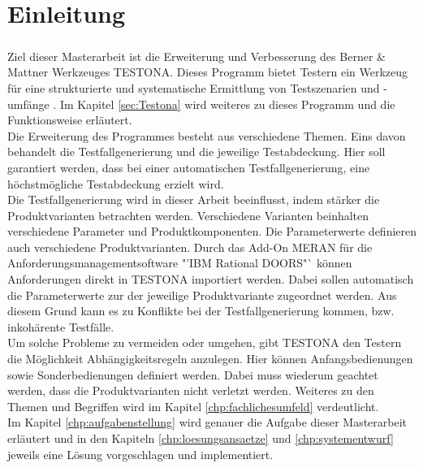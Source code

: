 \chapter{Einleitung}\label{chp:einleitung}
\paragraph{}
Ziel dieser Masterarbeit ist die Erweiterung und Verbesserung des Berner \& Mattner Werkzeuges TESTONA. Dieses Programm bietet Testern ein Werkzeug für eine strukturierte und systematische Ermittlung von Testszenarien und -umfänge \cite{TESTONA}. Im Kapitel \ref{sec:Testona} wird weiteres zu dieses Programm und die Funktionsweise erläutert.\\

Die Erweiterung des Programmes besteht aus verschiedene Themen. Eins davon behandelt die Testfallgenerierung und die jeweilige Testabdeckung. Hier soll garantiert werden, dass bei einer automatischen Testfallgenerierung, eine höchstmögliche Testabdeckung erzielt wird.\\

Die Testfallgenerierung wird in dieser Arbeit beeinflusst, indem stärker die Produktvarianten betrachten werden. Verschiedene Varianten beinhalten verschiedene Parameter und Produktkomponenten. Die Parameterwerte definieren auch verschiedene Produktvarianten. Durch das Add-On MERAN für die Anforderungsmanagementsoftware "'IBM Rational DOORS"` können Anforderungen direkt in  TESTONA importiert werden. Dabei sollen automatisch die Parameterwerte zur der jeweilige Produktvariante zugeordnet werden. Aus diesem Grund kann es zu Konflikte bei der Testfallgenerierung kommen, bzw. inkohärente Testfälle.\\

Um solche Probleme zu vermeiden oder umgehen, gibt TESTONA den Testern die Möglichkeit Abhängigkeitsregeln anzulegen. Hier können Anfangsbedienungen sowie Sonderbedienungen definiert werden. Dabei muss wiederum geachtet werden, dass die Produktvarianten nicht verletzt werden. Weiteres zu den Themen und Begriffen wird im Kapitel \ref{chp:fachlichesumfeld} verdeutlicht.\\

Im Kapitel \ref{chp:aufgabenstellung} wird genauer die Aufgabe dieser Masterarbeit erläutert und in den Kapiteln \ref{chp:loesungsansaetze} und \ref{chp:systementwurf} jeweils eine Lösung vorgeschlagen und implementiert.


